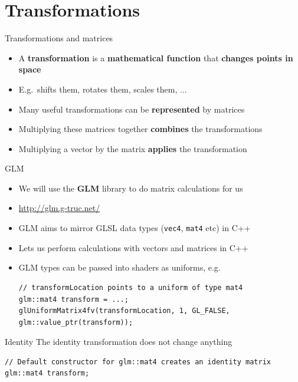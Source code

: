 \part{Transformations}
\frame{\partpage}

\begin{frame}{Transformations and matrices}
	\begin{itemize}
		\pause\item A \textbf{transformation} is a \textbf{mathematical function} that \textbf{changes points in space}
		\pause\item E.g.\ shifts them, rotates them, scales them, ...
		\pause\item Many useful transformations can be \textbf{represented} by matrices
		\pause\item Multiplying these matrices together \textbf{combines} the transformations
		\pause\item Multiplying a vector by the matrix \textbf{applies} the transformation
	\end{itemize}
\end{frame}

\begin{frame}[fragile]{GLM}
	\begin{itemize}
		\pause\item We will use the \textbf{GLM} library to do matrix calculations for us
		\pause\item \url{http://glm.g-truc.net/}
		\pause\item GLM aims to mirror GLSL data types (\lstinline{vec4}, \lstinline{mat4} etc) in C++
		\pause\item Lets us perform calculations with vectors and matrices in C++
		\pause\item GLM types can be passed into shaders as uniforms, e.g.
			\begin{lstlisting}
// transformLocation points to a uniform of type mat4
glm::mat4 transform = ...;
glUniformMatrix4fv(transformLocation, 1, GL_FALSE, glm::value_ptr(transform));
			\end{lstlisting}
	\end{itemize}
\end{frame}

\begin{frame}[fragile]{Identity}
	\pause The identity transformation does not change anything
	\pause \begin{lstlisting}
// Default constructor for glm::mat4 creates an identity matrix
glm::mat4 transform;
	\end{lstlisting}
\end{frame}

